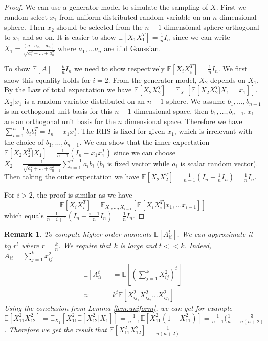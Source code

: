 \documentclass{article}
\def\E{\mathbb{E}}
\newtheorem{remark}{Remark}
\begin{document}
\begin{proof}
We can use a generator model to simulate the sampling of $X$.
First we random select $x_1$
from uniform distributed random variable on an $n$ dimensional sphere.
Then $x_2$ should be selected from the $n-1$ dimensional sphere
orthogonal to $x_1$ and so on.
It is easier to show $\E[X_1X_1^T] = \frac{1}{n} I_n$
since we can write
$X_1 = \frac{(a_1, a_2, \dots a_n) }{\sqrt{a_1^2+\dots + a_n^2}}$
where $a_1, \dots a_n$ are i.i.d Gaussian.

To show $\E[A]=\frac{k}{n}I_n$ we need to show respectively
$\E[X_iX_i^T]=\frac{1}{n} I_n$.
We first show this equality holds for $i=2$.
From the generator model, $X_2$ depends on $X_1$.
By the Law of total expectation we have
$\E[X_2 X_2^T] = \E_{X_1}[\E[X_2 X_2^T |X_1 = x_1]]$.
$X_2 | x_1$ is a random variable distributed on an $n-1$ sphere.
We assume $b_1, \dots, b_{n-1}$ is an orthogonal unit basis
for this $n-1$ dimensional space,
then $b_1, \dots, b_{n-1}, x_1$ are an orthogonal unit basis
for the $n$ dimensional space. Therefore we have
$\sum_{i=1}^{n-1} b_i b_i^T = I_n -  x_1 x_1^T $.
The RHS is fixed for given $x_1$,
which is irrelevant with the choice of $b_1, \dots, b_{n-1}$.
We can show that the inner expectation
$\E[X_2 X_2^T |X_1] = \frac{1}{n-1}(I_n - x_1 x_1^T)$
since we can choose
$X_2 = \frac{1}{\sqrt{a_1^2 + \dots + a_{n-1}^2}}\sum_{i=1}^{n-1} a_i b_i$
($b_i$ is fixed vector while $a_i$ is scalar random vector).
Then taking the outer expectation we have
$\E[X_2 X_2^T] = \frac{1}{n-1} (I_n - \frac{1}{n} I_n) = \frac{1}{n} I_n$.

For $i>2$, the proof is similar as we have
$$
\E[X_i X_i^T] =
\E_{X_1, \dots, X_{i-1}} [\E[X_i X_i^T | x_1, \dots x_{i-1}]]
$$
which equals $\frac{1}{n-i+1}(I_n - \frac{i-1}{n} I_n) = \frac{1}{n} I_n$.
\end{proof}
\begin{remark}
To compute higher order moments $\E[A_{ii}^t]$.
We can approximate it by $r^t$ where $r=\frac{k}{n}$.
We require that $k$ is large and  $ t << k$.
Indeed, $A_{ii} = \sum_{j=1}^k x_{ij}^2$
\begin{align*}
\E[A^t_{ii}] & = \E[(\sum_{j=1}^k X_{ij}^2)^t] \\
\approx & k^t \E[X^2_{ij_1}X^2_{ij_2}\dots X^2_{ij_t}]
\end{align*}
Using the conclusion from Lemma \ref{lem:uniform},
we can get for example $\E[X_{11}^2 X_{12}^2]
= \E_{X_1}[X_{11}^2 \E[ X^2_{12}| X_1]]
= \frac{1}{n-1}\E[X_{11}^2 ( 1 - X_{11}^2 )] =
\frac{1}{n-1}(\frac{1}{n} - \frac{3}{n(n+2)}$.
Therefore we get the result that $\E[X_{11}^2 X_{12}^2]  =  \frac{1}{n(n+2)}$
\end{remark}
\end{document}
